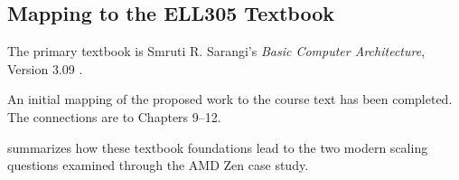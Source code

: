 \documentclass[12pt,a4paper,twoside]{article}
\begin{document}
\subsection{Mapping to the ELL305 Textbook}
\label{sec:textbook}

The primary textbook is Smruti R. Sarangi's \emph{Basic Computer Architecture}, Version 3.09 \cite{sarangi2025basic}.

An initial mapping of the proposed work to the course text has been completed. The connections are to Chapters 9--12.

 summarizes how these textbook foundations lead to the two modern scaling questions examined through the AMD Zen case study.

\end{document}
